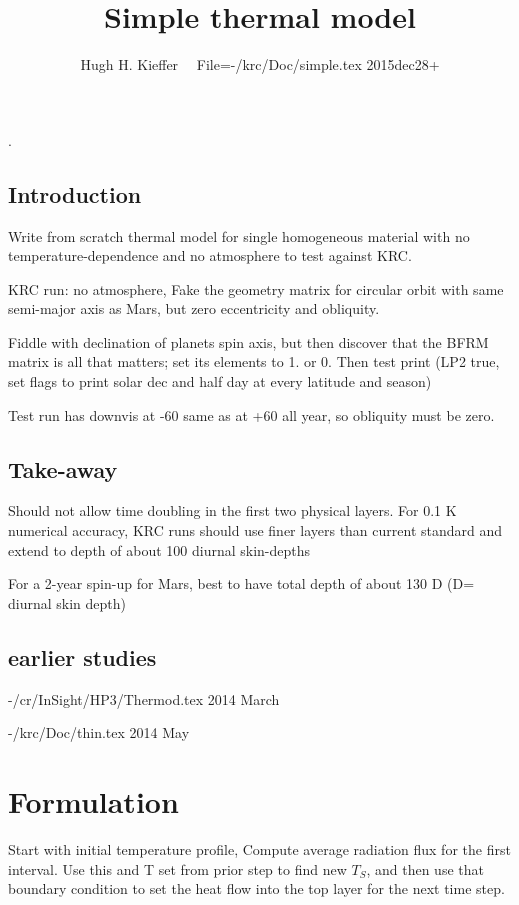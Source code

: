 \documentclass{article}
\title{Simple thermal model}
\author{Hugh H. Kieffer  \ \ File=-/krc/Doc/simple.tex  2015dec28+}
\begin{document}
\maketitle
\tableofcontents
\listoffigures
\listoftables
\hrulefill .\hrulefill
\subsection{Introduction}
Write from scratch thermal model for single homogeneous material
with no temperature-dependence and no atmosphere to test against KRC.

 KRC run: no atmosphere, Fake the geometry matrix for circular orbit with same semi-major axis as Mars, but zero eccentricity and obliquity.

 Fiddle with declination of planets spin axis, but then discover that the BFRM matrix is all that matters; set its elements to 1. or 0. Then test print (LP2 true, set flags to print solar dec and half day at every latitude and season) 

 Test run has downvis at -60 same as at +60 all year, so obliquity must be zero.

\subsection{Take-away}
Should not allow time doubling in the first two physical layers.
For 0.1 K numerical accuracy, KRC runs should use finer layers than current standard and extend to depth of about 100 diurnal skin-depths

For a 2-year spin-up for Mars, best to have total depth of about 130 D (D= diurnal skin depth) 

\subsection{earlier studies}
-/cr/InSight/HP3/Thermod.tex  2014 March

-/krc/Doc/thin.tex  2014 May

\section{Formulation} 

Start with initial temperature profile, Compute average radiation flux for the first interval. Use this and T set from prior step to find new $T_S$, and then use that boundary condition to set the heat flow into the top layer for the next time step.
\end{document}

